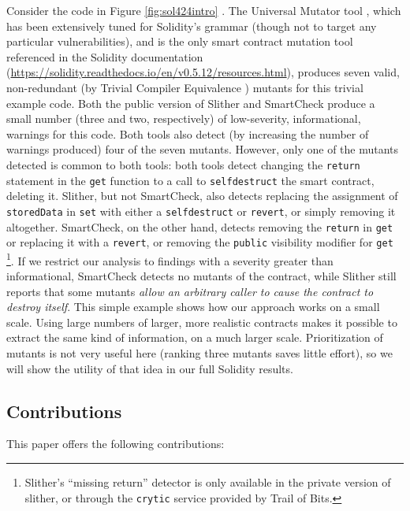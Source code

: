Consider the code in Figure \ref{fig:sol424intro} \cite{solintro}.  The Universal Mutator tool \cite{universalmutator,regexpMut}, which has been extensively tuned for Solidity's grammar (though not to target any particular vulnerabilities), and is the only smart contract mutation tool referenced in the Solidity documentation (\url{https://solidity.readthedocs.io/en/v0.5.12/resources.html}), produces seven valid, non-redundant (by Trivial Compiler Equivalence \cite{TCE}) mutants for this trivial example code.  Both the public version of Slither \cite{slither} and SmartCheck \cite{smartcheck} produce a small number (three and two, respectively) of low-severity, informational, warnings for this code.  Both tools also detect (by increasing the number of warnings produced) four of the seven mutants.  However, only one of the mutants detected is common to both tools: both tools detect changing the {\tt return} statement in the {\tt get} function to a call to {\tt selfdestruct} the smart contract, deleting it.  Slither, but not SmartCheck, also detects replacing the assignment of {\tt storedData} in {\tt set} with either a {\tt selfdestruct} or {\tt revert}, or simply removing it altogether.  SmartCheck, on the other hand, detects removing the {\tt return} in {\tt get} or replacing it with a {\tt revert}, or removing the {\tt public} visibility modifier for {\tt get} \footnote{Slither's ``missing return'' detector is only available in the private version of slither, or through the {\tt crytic} service provided by Trail of Bits.}.  If we restrict our analysis to findings with a severity greater than informational, SmartCheck detects no mutants of the contract, while Slither still reports that some mutants \emph{allow an arbitrary caller to cause the contract to destroy itself}.  This simple example shows how our approach works on a small scale.  Using large numbers of larger, more realistic contracts makes it possible to extract the same kind of information, on a much larger scale.  Prioritization of mutants is not very useful here (ranking three mutants saves little effort), so we will show the utility of that idea in our full Solidity results.

\subsection{Contributions}

This paper offers the following contributions:

